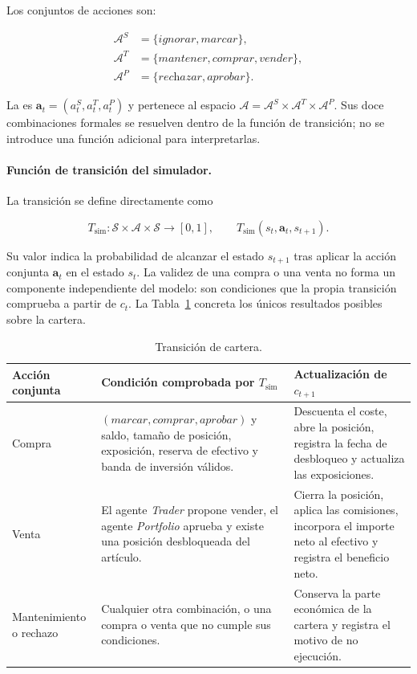Los conjuntos de acciones son:

\[
\begin{aligned}
\mathcal{A}^{S}&=\{\textit{ignorar},\textit{marcar}\},\\
\mathcal{A}^{T}&=\{\textit{mantener},\textit{comprar},\textit{vender}\},\\
\mathcal{A}^{P}&=\{\textit{rechazar},\textit{aprobar}\}.
\end{aligned}
\]

La  es $\mathbf{a}_t=(a_t^S,a_t^T,a_t^P)$ y pertenece al espacio $\mathcal{A}=\mathcal{A}^S\times\mathcal{A}^T\times\mathcal{A}^P$. Sus doce combinaciones formales se resuelven dentro de la función de transición; no se introduce una función adicional para interpretarlas.

\paragraph{Función de transición del simulador.}
La transición se define directamente como

\begin{equation}
T_{\mathrm{sim}}:\mathcal{S}\times\mathcal{A}\times\mathcal{S}\longrightarrow[0,1],
\qquad
T_{\mathrm{sim}}(s_t,\mathbf{a}_t,s_{t+1}).
\label{eq:funcion-transicion-cs2}
\end{equation}

Su valor indica la probabilidad de alcanzar el estado $s_{t+1}$ tras aplicar la acción conjunta $\mathbf{a}_t$ en el estado $s_t$. La validez de una compra o una venta no forma un componente independiente del modelo: son condiciones que la propia transición comprueba a partir de $c_t$. La Tabla~\ref{tab:transicion-simulador} concreta los únicos resultados posibles sobre la cartera.

\begin{table}[H]
\centering
\small
\begin{tabularx}{\textwidth}{@{}p{}p{}X@{}}
\toprule
\textbf{Acción conjunta} & \textbf{Condición comprobada por $T_{\mathrm{sim}}$} & \textbf{Actualización de $c_{t+1}$} \\
\midrule
Compra & $(\textit{marcar},\textit{comprar},\textit{aprobar})$ y saldo, tamaño de posición, exposición, reserva de efectivo y banda de inversión válidos. & Descuenta el coste, abre la posición, registra la fecha de desbloqueo y actualiza las exposiciones. \\
Venta & El agente \textit{Trader} propone vender, el agente \textit{Portfolio} aprueba y existe una posición desbloqueada del artículo. & Cierra la posición, aplica las comisiones, incorpora el importe neto al efectivo y registra el beneficio neto. \\
Mantenimiento o rechazo & Cualquier otra combinación, o una compra o venta que no cumple sus condiciones. & Conserva la parte económica de la cartera y registra el motivo de no ejecución. \\
\bottomrule
\end{tabularx}
\caption{Transición de cartera.}
\label{tab:transicion-simulador}
\end{table}


